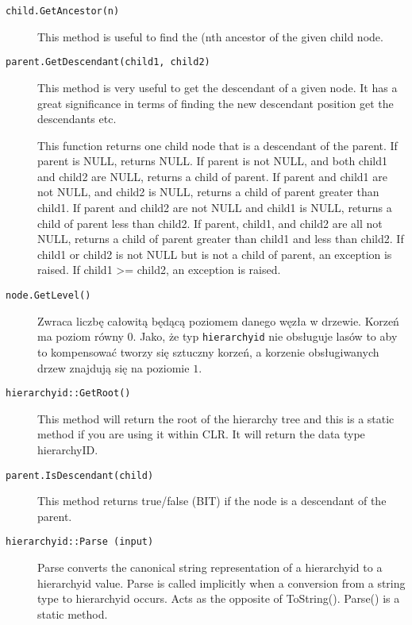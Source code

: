 \begin{description}
  \item[\texttt{child.GetAncestor(n)}]
	This method is useful to find the (nth ancestor of the given child node.

  \item[\texttt{parent.GetDescendant(child1, child2)}]
	This method is very useful to get the descendant of a given node. 
	It has a great significance in terms of finding the new descendant position get the descendants etc. 

	This function returns one child node that is a descendant of the parent. 
	If parent is NULL, returns NULL. 
	If parent is not NULL, and both child1 and child2 are NULL, returns a child of parent. 
	If parent and child1 are not NULL, and child2 is NULL, returns a child of parent greater than child1. 
	If parent and child2 are not NULL and child1 is NULL, returns a child of parent less than child2. 
	If parent, child1, and child2 are all not NULL, returns a child of parent greater than child1 and less than child2. 
	If child1 or child2 is not NULL but is not a child of parent, an exception is raised. 
	If child1 >= child2, an exception is raised.

  \item[\texttt{node.GetLevel()}]
	Zwraca liczbę całowitą będącą poziomem danego węzła w drzewie. 
	Korzeń ma poziom równy $0$. 
	Jako, że typ \texttt{hierarchyid} nie obsługuje lasów to aby to kompensować tworzy się sztuczny korzeń, a korzenie obsługiwanych drzew znajdują się na poziomie $1$.


  \item[\texttt{hierarchyid::GetRoot()}]
	This method will return the root of the hierarchy tree and this is a static method if you are using it within CLR. 
	It will return the data type hierarchyID. 

  \item[\texttt{parent.IsDescendant(child)}]
	This method returns true/false (BIT) if the node is a descendant of the parent. 

  \item[\texttt{hierarchyid::Parse (input)}]
	Parse converts the canonical string representation of a hierarchyid to a hierarchyid value. 
	Parse is called implicitly when a conversion from a string type to hierarchyid occurs. 
	Acts as the opposite of ToString(). 
	Parse() is a static method. 


\end{description}
